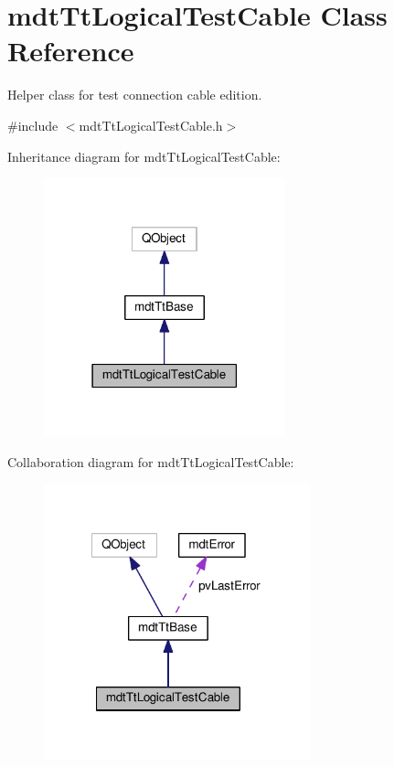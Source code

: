 \hypertarget{classmdt_tt_logical_test_cable}{\section{mdt\-Tt\-Logical\-Test\-Cable Class Reference}
\label{classmdt_tt_logical_test_cable}
}


Helper class for test connection cable edition.  




{\ttfamily \#include $<$mdt\-Tt\-Logical\-Test\-Cable.\-h$>$}



Inheritance diagram for mdt\-Tt\-Logical\-Test\-Cable\-:\nopagebreak
\begin{figure}[H]
\begin{center}
\leavevmode
\includegraphics[width=198pt]{classmdt_tt_logical_test_cable__inherit__graph}
\end{center}
\end{figure}


Collaboration diagram for mdt\-Tt\-Logical\-Test\-Cable\-:\nopagebreak
\begin{figure}[H]
\begin{center}
\leavevmode
\includegraphics[width=218pt]{classmdt_tt_logical_test_cable__coll__graph}
\end{center}
\end{figure}
